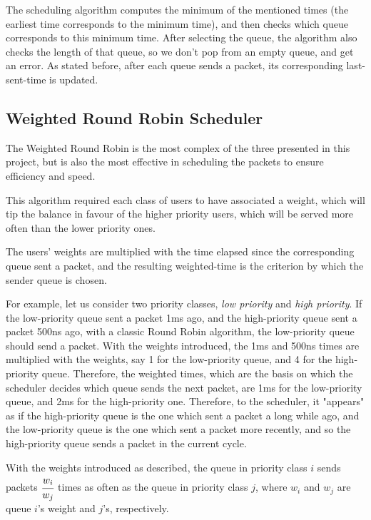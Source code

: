 \documentclass[12pt]{article}
\begin{document}
        The scheduling algorithm computes the minimum of the mentioned times (the earliest time corresponds to the minimum time), and then checks which queue corresponds to this minimum time. After selecting the queue, the algorithm also checks the length of that queue, so we don't pop from an empty queue, and get an error. As stated before, after each queue sends a packet, its corresponding last-sent-time is updated.

        \subsection{Weighted Round Robin Scheduler}

        The Weighted Round Robin is the most complex of the three presented in this project, but is also the most effective in scheduling the packets to ensure efficiency and speed.

        This algorithm required each class of users to have associated a weight, which will tip the balance in favour of the higher priority users, which will be served more often than the lower priority ones.

        The users' weights are multiplied with the time elapsed since the corresponding queue sent a packet, and the resulting weighted-time is the criterion by which the sender queue is chosen.

        For example, let us consider two priority classes, \textit{low priority} and \textit{high priority}. If the low-priority queue sent a packet 1ms ago, and the high-priority queue sent a packet 500ns ago, with a classic Round Robin algorithm, the low-priority queue should send a packet. With the weights introduced, the 1ms and 500ns times are multiplied with the weights, say 1 for the low-priority queue, and 4 for the high-priority queue. Therefore, the weighted times, which are the basis on which the scheduler decides which queue sends the next packet, are 1ms for the low-priority queue, and 2ms for the high-priority one. Therefore, to the scheduler, it "appears" as if the high-priority queue is the one which sent a packet a long while ago, and the low-priority queue is the one which sent a packet more recently, and so the high-priority queue sends a packet in the current cycle.

        With the weights introduced as described, the queue in priority class $i$ sends packets $\cfrac{w_i}{w_j}$ times as often as the queue in priority class $j$, where $w_i$ and $w_j$ are queue $i$'s weight and $j$'s, respectively.
        \pagebreak
\end{document}
